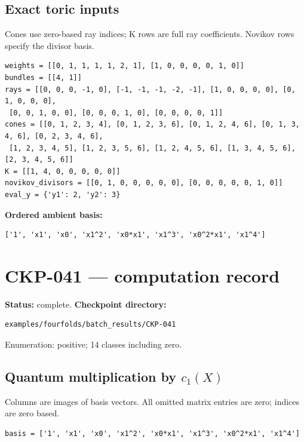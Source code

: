 \documentclass[10pt,a4paper]{article}
\begin{document}
\subsection*{Exact toric inputs}
Cones use zero-based ray indices; K rows are full ray coefficients. Novikov rows specify the divisor basis.

\begin{lstlisting}
weights = [[0, 1, 1, 1, 1, 2, 1], [1, 0, 0, 0, 0, 1, 0]]
bundles = [[4, 1]]
rays = [[0, 0, 0, -1, 0], [-1, -1, -1, -2, -1], [1, 0, 0, 0, 0], [0, 1, 0, 0, 0],
 [0, 0, 1, 0, 0], [0, 0, 0, 1, 0], [0, 0, 0, 0, 1]]
cones = [[0, 1, 2, 3, 4], [0, 1, 2, 3, 6], [0, 1, 2, 4, 6], [0, 1, 3, 4, 6], [0, 2, 3, 4, 6],
 [1, 2, 3, 4, 5], [1, 2, 3, 5, 6], [1, 2, 4, 5, 6], [1, 3, 4, 5, 6], [2, 3, 4, 5, 6]]
K = [[1, 4, 0, 0, 0, 0, 0]]
novikov_divisors = [[0, 1, 0, 0, 0, 0, 0], [0, 0, 0, 0, 0, 1, 0]]
eval_y = {'y1': 2, 'y2': 3}
\end{lstlisting}

\textbf{Ordered ambient basis:}
\begin{lstlisting}
['1', 'x1', 'x0', 'x1^2', 'x0*x1', 'x1^3', 'x0^2*x1', 'x1^4']
\end{lstlisting}

\clearpage\section*{CKP-041 --- computation record}
\textbf{Status:} complete.
\textbf{Checkpoint directory:}
\begin{lstlisting}
examples/fourfolds/batch_results/CKP-041
\end{lstlisting}

Enumeration: positive; 14 classes including zero.
\subsection*{Quantum multiplication by $c_1(X)$}
Columns are images of basis vectors. All omitted matrix entries are zero; indices are zero based.

\begin{lstlisting}
basis = ['1', 'x1', 'x0', 'x1^2', 'x0*x1', 'x1^3', 'x0^2*x1', 'x1^4']
\end{lstlisting}
\end{document}
